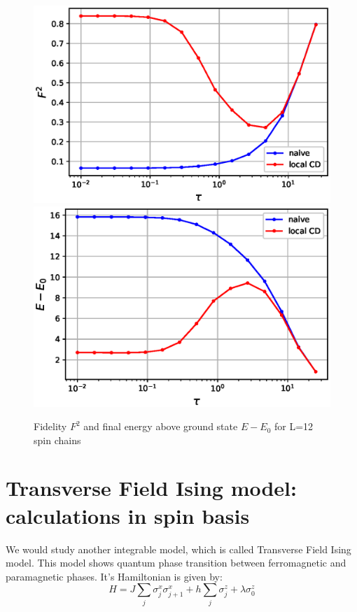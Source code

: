 \documentclass[11pt,a4paper]{article}
\begin{document}
\begin{figure}
\centering
\includegraphics[scale=0.5]{fidelity_naive.eps}
\includegraphics[scale=0.5]{final_energy_naive.eps}
\caption{Fidelity $F^2$ and final energy above ground state $E- E_0$ for L=12 spin chains}
\label{fid_energ}
\end{figure}


\section{Transverse Field Ising model: calculations in spin basis}
We would study another integrable model, which is called Transverse Field Ising model. This model shows quantum phase transition between ferromagnetic and paramagnetic phases. It's Hamiltonian is given by:
\begin{equation}
H= J \sum_{j} \sigma_j^x \sigma_{j+1}^x + h \sum_{j} \sigma_j^z + \lambda  \sigma_{0}^z
\label{xx_z_2}
\end{equation}
\end{document}
